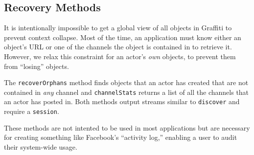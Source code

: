 

\subsection{Recovery Methods}

It is intentionally impossible to get a global view of all objects
in Graffiti to prevent context collapse. Most of the time,
an application must know either an object's URL or one of the channels
the object is contained in to retrieve it. However, we relax this
constraint for an actor's \emph{own} objects, to prevent them from
``losing'' objects.

The \texttt{recoverOrphans} method finds objects that an actor has created
that are not contained in \emph{any} channel and \texttt{channelStats}
returns a list of all the channels that an actor has posted in.
Both methods output streams similar to \texttt{discover}
and require a \texttt{session}.

These methods are not intented to be used in most applications but are
necessary for creating something like Facebook's ``activity log,''
enabling a user to audit their system-wide usage.
